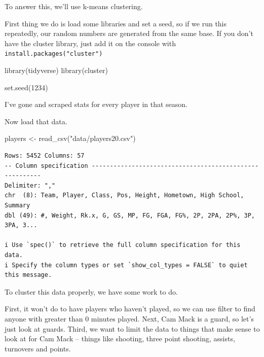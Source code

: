 \documentclass[
  letterpaper,
  DIV=11,
  numbers=noendperiod]{scrreprt}
\newenvironment{Shaded}{\begin{snugshade}}{\end{snugshade}}
\newcommand{\DecValTok}[1]{\textcolor[rgb]{0.68,0.00,0.00}{#1}}
\newcommand{\FunctionTok}[1]{\textcolor[rgb]{0.28,0.35,0.67}{#1}}
\newcommand{\NormalTok}[1]{\textcolor[rgb]{0.00,0.23,0.31}{#1}}
\newcommand{\OtherTok}[1]{\textcolor[rgb]{0.00,0.23,0.31}{#1}}
\newcommand{\StringTok}[1]{\textcolor[rgb]{0.13,0.47,0.30}{#1}}
\begin{document}
To answer this, we'll use k-means clustering.

First thing we do is load some libraries and set a seed, so if we run
this repeatedly, our random numbers are generated from the same base. If
you don't have the cluster library, just add it on the console with
\texttt{install.packages("cluster")}

\begin{Shaded}
\begin{Highlighting}[]
\FunctionTok{library}\NormalTok{(tidyverse)}
\FunctionTok{library}\NormalTok{(cluster)}

\FunctionTok{set.seed}\NormalTok{(}\DecValTok{1234}\NormalTok{)}
\end{Highlighting}
\end{Shaded}

I've gone and scraped stats for every player in that season.

Now load that data.

\begin{Shaded}
\begin{Highlighting}[]
\NormalTok{players }\OtherTok{\textless{}{-}} \FunctionTok{read\_csv}\NormalTok{(}\StringTok{"data/players20.csv"}\NormalTok{)}
\end{Highlighting}
\end{Shaded}

\begin{verbatim}
Rows: 5452 Columns: 57
-- Column specification --------------------------------------------------------
Delimiter: ","
chr  (8): Team, Player, Class, Pos, Height, Hometown, High School, Summary
dbl (49): #, Weight, Rk.x, G, GS, MP, FG, FGA, FG%, 2P, 2PA, 2P%, 3P, 3PA, 3...

i Use `spec()` to retrieve the full column specification for this data.
i Specify the column types or set `show_col_types = FALSE` to quiet this message.
\end{verbatim}

To cluster this data properly, we have some work to do.

First, it won't do to have players who haven't played, so we can use
filter to find anyone with greater than 0 minutes played. Next, Cam Mack
is a guard, so let's just look at guards. Third, we want to limit the
data to things that make sense to look at for Cam Mack -- things like
shooting, three point shooting, assists, turnovers and points.
\end{document}
